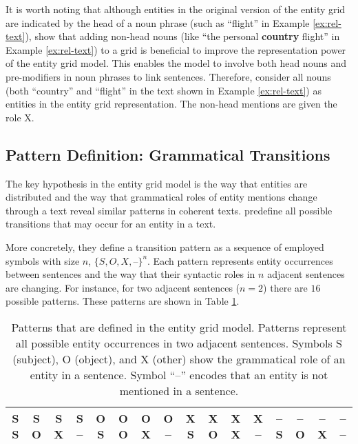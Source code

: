 It is worth noting that although entities in the original version of the entity grid are indicated by the head of a noun phrase (such as ``flight'' in Example \ref{ex:rel-text}),  show that adding non-head nouns (like ``the personal \textbf{country} flight'' in Example \ref{ex:rel-text}) to a grid is beneficial to improve the representation power of the entity grid model. 
This enables the model to involve both head nouns and pre-modifiers in noun phrases to link sentences. 
Therefore,  consider all nouns (both ``country'' and ``flight'' in the text shown in Example \ref{ex:rel-text}) as entities in the entity grid representation.  
The non-head mentions are given the role X. 

\subsection{Pattern Definition: Grammatical Transitions}

The key hypothesis in the entity grid model is the way that entities are distributed and the way that grammatical roles of entity mentions change through a text reveal similar patterns in coherent texts.  
 predefine all possible transitions that may occur for an entity in a text. 

More concretely, they define a transition pattern as a sequence of employed symbols with size $n$, $\{ S,O,X,\textit{--} \}^n$. 
Each pattern represents entity occurrences between sentences and the way that their syntactic roles in $n$ adjacent sentences are changing. 
For instance, for two adjacent sentences ($n=2$) there are $16$ possible patterns.
These patterns are shown in Table \ref{table:rel-egrid-pattern}.

\begin{table}[!ht]
	\begin{center}
		\resizebox{\columnwidth}{!}
		{%
			\begin{tabular}{@{}cccccccccccccccc@{}}
			\toprule
			S S & S O & S X & S -- & 
			O S & O O & O X & O -- & 
			X S & X O & X X & X -- & 
			-- S & -- O & -- X & -- -- 
			\\
			\bottomrule	
			\end{tabular}
		}%
	\end{center}
	\caption{Patterns that are defined in the entity grid model.  
	Patterns represent all possible entity occurrences in two adjacent sentences. 
	Symbols S (subject), O (object), and X (other) show the grammatical role of an entity in a sentence. Symbol ``--'' encodes that an entity is not mentioned in a sentence.}
	\label{table:rel-egrid-pattern}
\end{table}

